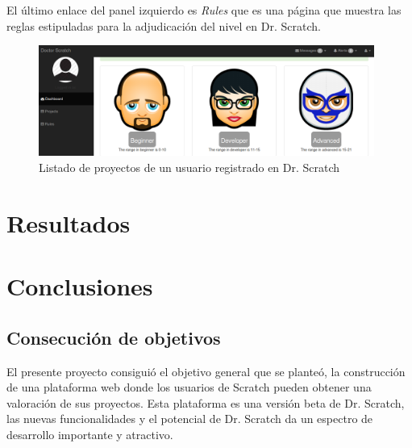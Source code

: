 \documentclass[a4paper, 12pt]{book}
\begin{document}
El último enlace del panel izquierdo es \emph{Rules} que es una página que muestra
las reglas estipuladas para la adjudicación del nivel en Dr. Scratch.

\begin{figure}
	\graphicspath{{img/}}
  \includegraphics[bb=0 0 800 600, width=11cm, keepaspectratio]{niveles.png}
	\caption{Listado de proyectos de un usuario registrado en Dr. Scratch}
  \label{figura:foro_hilos}
\end{figure}




\cleardoublepage
\chapter{Resultados}



\cleardoublepage
\chapter{Conclusiones}
\label{chap:conclusiones}


\section{Consecución de objetivos}
\label{sec:consecucion-objetivos}

El presente proyecto consiguió el objetivo general que se planteó, la 
construcción de una plataforma web donde los usuarios de Scratch pueden 
obtener una valoración de sus proyectos. Esta plataforma es una versión
beta de Dr. Scratch, las nuevas funcionalidades y el potencial de Dr. 
Scratch da un espectro de desarrollo importante y atractivo.
\end{document}
